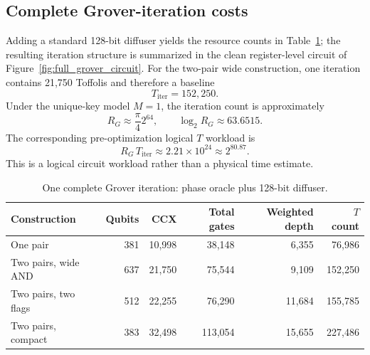 \documentclass[pdflatex,sn-nature]{sn-jnl}
\theoremstyle{thmstyleone}
\theoremstyle{thmstyletwo}
\begin{document}
\subsection{Complete Grover-iteration costs}
Adding a standard 128-bit diffuser yields the resource counts in Table~\ref{tab:iteration_resources}; the resulting iteration structure is summarized in the clean register-level circuit of Figure~\ref{fig:full_grover_circuit}. For the two-pair wide construction, one iteration contains 21,750 Toffolis and therefore a baseline
\begin{equation}
    T_{\mathrm{iter}}=152{,}250.
\end{equation}
Under the unique-key model $M=1$, the iteration count is approximately
\begin{equation}
    R_G \approx \frac{\pi}{4}2^{64}, \qquad \log_2 R_G\approx63.6515.
\end{equation}
The corresponding pre-optimization logical $T$ workload is
\begin{equation}
    R_G\,T_{\mathrm{iter}} \approx 2.21\times10^{24}\approx2^{80.87}.
    \label{eq:total_t}
\end{equation}
This is a logical circuit workload rather than a physical time estimate.

\begin{table}[t]
\centering
\caption{One complete Grover iteration: phase oracle plus 128-bit diffuser.}
\label{tab:iteration_resources}
\small
\begin{tabular}{lrrrrr}
\toprule
Construction & Qubits & CCX & Total gates & Weighted depth & $T$ count\\
\midrule
One pair & 381 & 10,998 & 38,148 & 6,355 & 76,986\\
Two pairs, wide AND & 637 & 21,750 & 75,544 & 9,109 & 152,250\\
Two pairs, two flags & 512 & 22,255 & 76,290 & 11,684 & 155,785\\
Two pairs, compact & 383 & 32,498 & 113,054 & 15,655 & 227,486\\
\bottomrule
\end{tabular}
\end{table}
\end{document}
